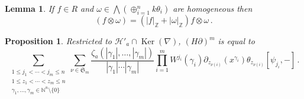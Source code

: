 \documentclass[english,letter paper,12pt,leqno]{article}
\newtheorem{proposition}[theorem]{Proposition}
\newtheorem{lemma}[theorem]{Lemma}
\theoremstyle{example}
\numberwithin{equation}{section}
\def\Ker{\operatorname{Ker}}
\def\be{\begin{equation}}
\def\ee{\end{equation}}
\def\nZ{\mathds{Z}}
\begin{document}
\begin{lemma}\label{lemma:commutator_numberop} If $f \in R$ and $\omega \in \bigwedge( \oplus_{i=1}^n k \theta_i )$ are homogeneous then
\be
[d_K, \nabla]( f \otimes \omega ) = ( |f|_{\nZ} + |\omega|_{\nZ} ) f \otimes \omega\,.
\ee
\end{lemma}

\begin{proposition}\label{prop:hpartialmrestrict} Restricted to $\mathscr{H}'_a \cap \Ker(\nabla)$, $(H \partial)^m$ is equal to
\be\label{eq:hpartialmrestrict}
\sum_{\substack{1 \le j_1 < \cdots < j_m \le n \\ 1 \le z_1 < \cdots < z_m \le n \\ \gamma_1,\ldots,\gamma_m \in \mathbb{N}^n \setminus \{0\}}} \sum_{\nu \in \mathfrak{S}_m} \frac{\zeta_{a}( |\gamma_1|,\ldots,|\gamma_m| )}{|\gamma_1| \cdots |\gamma_m|} \prod_{i=1}^m W^{j_i}(\gamma_i) \partial_{z_{\nu(i)}}(x^{\gamma_i}) \theta_{z_{\nu(i)}} [ \psi_{j_i}, - ]\,.
\ee
\end{proposition}
\end{document}
